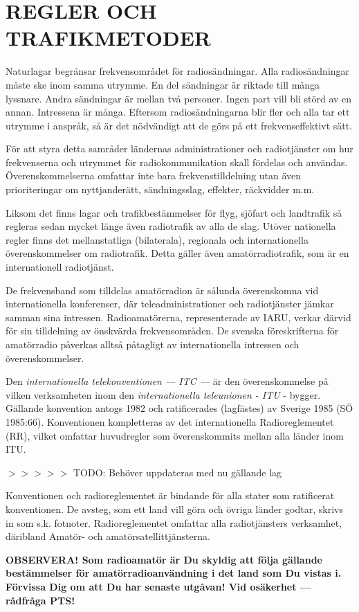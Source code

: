 \part{REGLER OCH TRAFIKMETODER}

Naturlagar begränsar frekvensområdet för radiosändningar. Alla
radiosändningar måste ske inom samma utrymme. En del sändningar är
riktade till många lyssnare. Andra sändningar är mellan två
personer. Ingen part vill bli störd av en annan. Intressena är
många. Eftersom radiosändningarna blir fler och alla tar ett utrymme i
anspråk, så är det nödvändigt att de görs på ett frekvenseffektivt
sätt.

För att styra detta samråder ländernas administrationer och
radiotjänster om hur frekvenserna och utrymmet för radiokommunikation
skall fördelas och användas.  Överenskommelserna omfattar inte bara
frekvenstilldelning utan även prioriteringar om nyttjanderätt,
sändningsslag, effekter, räckvidder m.m.

Liksom det finns lagar och trafikbestämmelser för flyg, sjöfart och
landtrafik så regleras sedan mycket länge även radiotrafik av alla de
slag. Utöver nationella regler finns det mellanstatliga (bilaterala),
regionala och internationella överenskommelser om radiotrafik. Detta
gäller även amatörradiotrafik, som är en internationell radiotjänst.

De frekvensband som tilldelas amatörradion är sålunda överenskomna vid
internationella konferenser, där teleadministrationer och
radiotjänster jämkar samman sina intressen. Radioamatörerna,
representerade av IARU, verkar därvid för sin tilldelning av önskvärda
frekvensområden. De svenska föreskrifterna för amatörradio påverkas
alltså påtagligt av internationella intressen och överenskommelser.

Den \emph{internationella telekonventionen --- ITC ---} är den
överenskommelse på vilken verksamheten inom den \emph{internationella
  teleunionen - ITU} - bygger. Gällande konvention antogs 1982 och
ratificerades (lagfästes) av Sverige 1985 (SÖ 1985:66). Konventionen
kompletteras av det internationella Radioreglementet (RR), vilket
omfattar huvudregler som överenskommits mellan alla länder inom ITU.

$>>>>>$ TODO: Behöver uppdateras med nu gällande lag

Konventionen och radioreglementet är bindande för alla stater som
ratificerat konventionen. De avsteg, som ett land vill göra och övriga
länder godtar, skrivs in som s.k. fotnoter. Radioreglementet omfattar
alla radiotjänsters verksamhet, däribland Amatör- och
amatörsatellittjänsterna.

\textbf{OBSERVERA!  Som radioamatör är Du skyldig att följa gällande
  bestämmelser för amatörradioanvändning i det land som Du vistas i.
  Förvissa Dig om att Du har senaste utgåvan!  Vid osäkerhet ---
  rådfråga PTS!}
